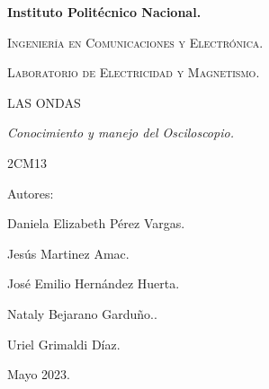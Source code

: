 \documentclass[10pt]{article}
\begin{document}
\pagestyle{fancy}
\cfoot{}


\lhead{}

\begin{titlepage}

	\begin{figure}[t]
		\hspace{0.7\textwidth}
	\end{figure}

	\centering
	{\bfseries\Huge Instituto Politécnico Nacional. \par}
	\vspace{1cm}
	{\scshape\Large Ingeniería en Comunicaciones y Electrónica. \par}
	\vspace{0.3cm}
	{\scshape\Large Laboratorio de Electricidad y Magnetismo.  \par}
	\vspace{1cm}
	{\scshape\Huge LAS ONDAS \par}
	\vspace{1cm}
	{\itshape\Large Conocimiento y manejo del Osciloscopio. \par}
	{\Large 2CM13\par}
	\vfill
	{\Large Autores: \par}
	{\Large Daniela Elizabeth Pérez Vargas. \par}
	{\Large Jesús Martinez Amac. \par}
	{\Large José Emilio Hernández Huerta. \par}
	{\Large Nataly Bejarano Garduño..\par}
	{\Large Uriel Grimaldi Díaz.  \par}
	\vfill
	{\Large Mayo 2023. \par}

\end{titlepage}
\end{document}

